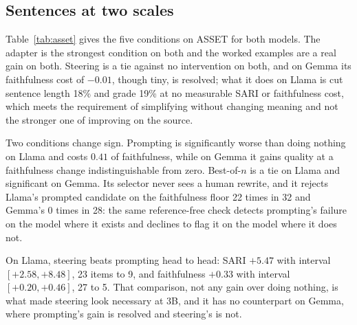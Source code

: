 \documentclass[aps,prb,reprint,nofootinbib,a4paper]{revtex4-2}
\begin{document}
\subsection{Sentences at two scales}
\label{sec:eval}

Table~\ref{tab:asset} gives the five conditions on ASSET for both models. The
adapter is the strongest condition on both and the worked examples are a real
gain on both. Steering is a tie against no intervention on both, and on Gemma
its faithfulness cost of $-0.01$, though tiny, is resolved; what it does on
Llama is cut sentence length 18\% and grade 19\% at no measurable SARI or
faithfulness cost, which meets the requirement of simplifying without changing
meaning and not the stronger one of improving on the source.

Two conditions change sign. Prompting is significantly worse than doing
nothing on Llama and costs $0.41$ of faithfulness, while on Gemma it gains
quality at a faithfulness change indistinguishable from zero. Best-of-$n$ is a
tie on Llama and significant on Gemma. Its selector never sees a human rewrite,
and it rejects Llama's prompted candidate on the faithfulness floor 22 times in
32 and Gemma's 0 times in 28: the same reference-free check detects prompting's
failure on the model where it exists and declines to flag it on the model where
it does not.

On Llama, steering beats prompting head to head: SARI $+5.47$ with interval
$[+2.58, +8.48]$, 23 items to 9, and faithfulness $+0.33$ with interval
$[+0.20, +0.46]$, 27 to 5. That comparison, not any gain over doing nothing,
is what made steering look necessary at 3B, and it has no counterpart on
Gemma, where prompting's gain is resolved and steering's is not.
\end{document}

